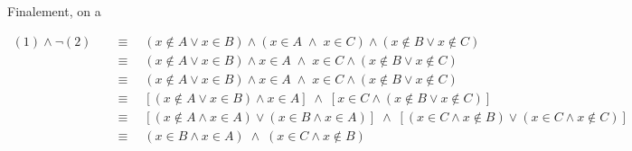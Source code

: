 Finalement, on a

\begin{align*}
	(1) \wedge \neg (2) \quad & \equiv \quad (x \notin A \vee x \in B)  \wedge  (x \in A \; \wedge \; x \in C) \wedge (x \notin B \vee x \notin C)                                      \\
	                          & \equiv \quad (x \notin A \vee x \in B)  \wedge  x \in A \; \wedge \; x \in C \wedge (x \notin B \vee x \notin C)                                        \\
	                          & \equiv \quad (x \notin A \vee x \in B)  \wedge  x \in A \; \wedge \; x \in C \wedge (x \notin B \vee x \notin C)                                        \\ %
	                        & \equiv \quad [(x \notin A \vee x \in B)  \wedge  x \in A ]\; \wedge \; [x \in C \wedge (x \notin B \vee x \notin C)]                                    \\ %
	                         & \equiv \quad [(x \notin A  \wedge  x \in A) \vee (x \in B \wedge  x \in A) ]\; \wedge \; [(x \in C \wedge x \notin B) \vee (x \in C \wedge x \notin C)] \\ & \equiv \quad (x \in B \wedge  x \in A) \; \wedge \; (x \in C \wedge x \notin B)
\end{align*}